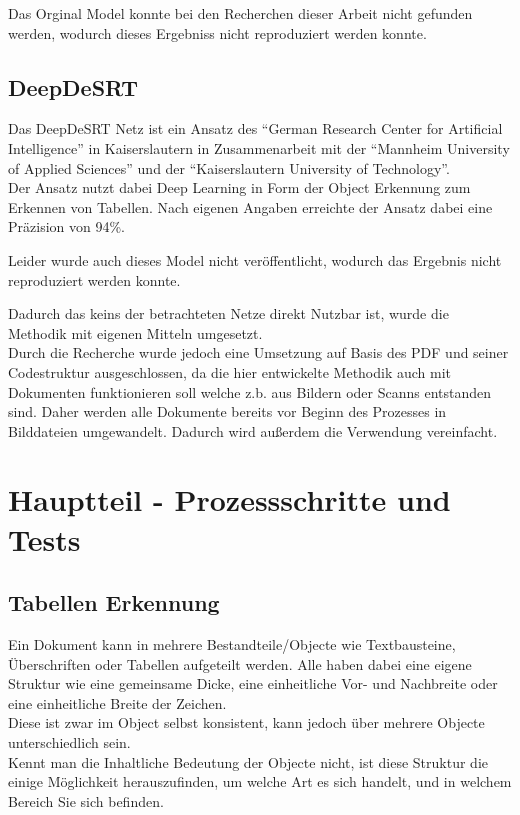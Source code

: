 \documentclass[
]{article}
\begin{document}
Das Orginal Model konnte bei den Recherchen dieser Arbeit nicht gefunden
werden, wodurch dieses Ergebniss nicht reproduziert werden konnte.

\hypertarget{header-n74}{%
\subsection{DeepDeSRT}\label{header-n74}}

Das DeepDeSRT Netz ist ein Ansatz des ``German Research Center for
Artificial Intelligence'' in Kaiserslautern in Zusammenarbeit mit der
``Mannheim University of Applied Sciences'' und der ``Kaiserslautern
University of Technology''. \\
Der Ansatz nutzt dabei Deep Learning in Form der Object Erkennung zum
Erkennen von Tabellen. Nach eigenen Angaben erreichte der Ansatz dabei
eine Präzision von 94\%.

Leider wurde auch dieses Model nicht veröffentlicht, wodurch das
Ergebnis nicht reproduziert werden konnte.

Dadurch das keins der betrachteten Netze direkt Nutzbar ist, wurde die
Methodik mit eigenen Mitteln umgesetzt. \\
Durch die Recherche wurde jedoch eine Umsetzung auf Basis des PDF und
seiner Codestruktur ausgeschlossen, da die hier entwickelte Methodik
auch mit Dokumenten funktionieren soll welche z.b. aus Bildern oder
Scanns entstanden sind. Daher werden alle Dokumente bereits vor Beginn
des Prozesses in Bilddateien umgewandelt. Dadurch wird außerdem die
Verwendung vereinfacht.

\hypertarget{header-n79}{%
\section{Hauptteil - Prozessschritte und Tests}\label{header-n79}}

\hypertarget{header-n80}{%
\subsection{Tabellen Erkennung}\label{header-n80}}

Ein Dokument kann in mehrere Bestandteile/Objecte wie Textbausteine,
Überschriften oder Tabellen aufgeteilt werden. Alle haben dabei eine
eigene Struktur wie eine gemeinsame Dicke, eine einheitliche Vor- und
Nachbreite oder eine einheitliche Breite der Zeichen. \\
Diese ist zwar im Object selbst konsistent, kann jedoch über mehrere
Objecte unterschiedlich sein.\\
Kennt man die Inhaltliche Bedeutung der Objecte nicht, ist diese
Struktur die einige Möglichkeit herauszufinden, um welche Art es sich
handelt, und in welchem Bereich Sie sich befinden.
\end{document}
